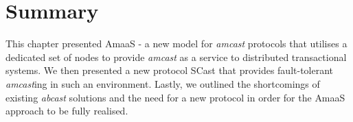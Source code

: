 
\section{Summary}
This chapter presented \textsf{AmaaS} - a new model for \emph{amcast} protocols that utilises a dedicated set of nodes to provide \emph{amcast} as a service to distributed transactional systems.  We then presented a new protocol \textsf{SCast} that provides fault-tolerant \emph{amcast}ing in such an environment.  Lastly, we outlined the shortcomings of existing \emph{abcast} solutions and the need for a new protocol in order for the \textsf{AmaaS} approach to be fully realised. 